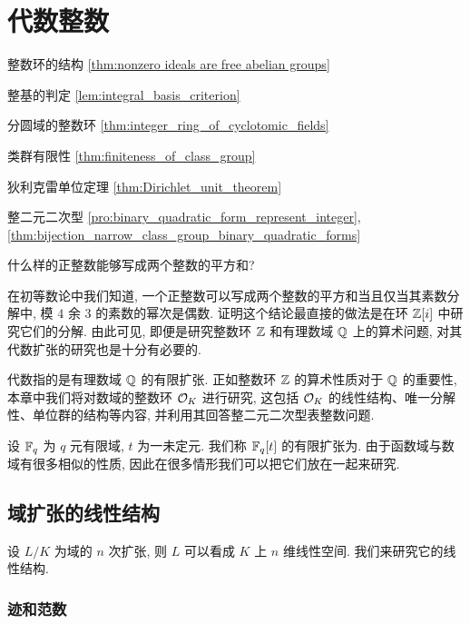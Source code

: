 \chapter{代数整数}
\begin{introduction}
\item 整数环的结构 \ref{thm:nonzero ideals are free abelian groups}
\item 整基的判定 \ref{lem:integral_basis_criterion}
\item 分圆域的整数环 \ref{thm:integer_ring_of_cyclotomic_fields}
\item 类群有限性 \ref{thm:finiteness_of_class_group}
\item 狄利克雷单位定理 \ref{thm:Dirichlet_unit_theorem}
\item 整二元二次型 \ref{pro:binary_quadratic_form_represent_integer}, \ref{thm:bijection_narrow_class_group_binary_quadratic_forms}
\end{introduction}

\begin{question*}{}
什么样的正整数能够写成两个整数的平方和?
\end{question*}


在初等数论中我们知道, 一个正整数可以写成两个整数的平方和当且仅当其素数分解中, 模 $4$ 余 $3$ 的素数的幂次是偶数. 证明这个结论最直接的做法是在环 ${\mathbb{Z}}[i]$ 中研究它们的分解. 由此可见, 即便是研究整数环 ${\mathbb{Z}}$ 和有理数域 ${\mathbb{Q}}$ 上的算术问题, 对其代数扩张的研究也是十分有必要的.

代数指的是有理数域 ${\mathbb{Q}}$ 的有限扩张. 正如整数环 ${\mathbb{Z}}$ 的算术性质对于 ${\mathbb{Q}}$ 的重要性, 本章中我们将对数域的整数环 ${\mathcal{O}}_K$ 进行研究, 这包括 ${\mathcal{O}}_K$ 的线性结构、唯一分解性、单位群的结构等内容, 并利用其回答整二元二次型表整数问题.

设 ${\mathbb{F}}_q$ 为 $q$ 元有限域, $t$ 为一未定元. 我们称 ${\mathbb{F}}_q[t]$ 的有限扩张为.
由于函数域与数域有很多相似的性质, 因此在很多情形我们可以把它们放在一起来研究.

\section{域扩张的线性结构}

设 $L/K$ 为域的 $n$ 次扩张, 则 $L$ 可以看成 $K$ 上 $n$ 维线性空间. 我们来研究它的线性结构.

\subsection{迹和范数}

